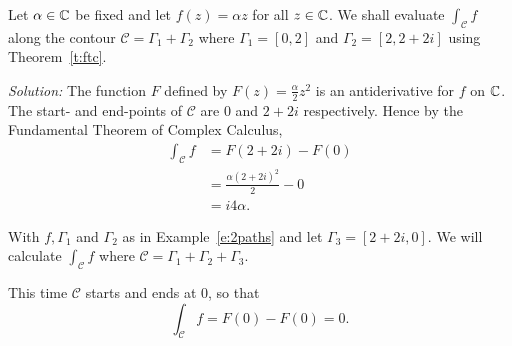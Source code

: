 \begin{example}
\label{e:2paths}
Let $\alpha \in \mathbb{C}$ be fixed and let $f(z)=\alpha z$ for all $z \in \mathbb{C}$.  We shall evaluate $\int_{\mathcal{C}} f$ along the contour $\mathcal{C}=\Gamma_1 + \Gamma_2$ where $\Gamma_1=[0,2]$ and $\Gamma_2 = [2,2+2i]$ using Theorem~\ref{t:ftc}.
\end{example}
\noindent\emph{Solution: }
The function $F$ defined by $F(z)=\frac{\alpha}{2} z^2$ is an antiderivative for $f$ on $\mathbb{C}$.
  The start- and end-points of $\mathcal{C}$ are $0$ and $2+2i$ respectively.  Hence by the Fundamental Theorem of Complex Calculus,
\begin{align*}
\int_{\mathcal{C}} f &= F(2+2i)-F(0) \\
& = \frac{\alpha (2+2i)^2}{2} - 0 \\
& = i 4 \alpha.
\end{align*}


\begin{example}
With $f,\Gamma_1$ and $\Gamma_2$ as in Example~\ref{e:2paths} and let $\Gamma_3 = [2+2i,0]$.  We will calculate $\int_{\mathcal{C}} f$ where $\mathcal{C}=\Gamma_1+\Gamma_2+\Gamma_3$.
\end{example}
\begin{solution}
This time $\mathcal{C}$ starts and ends at $0$, so that
\[
\int_{\mathcal{C}} f = F(0) - F(0) = 0.
\]
\end{solution}

